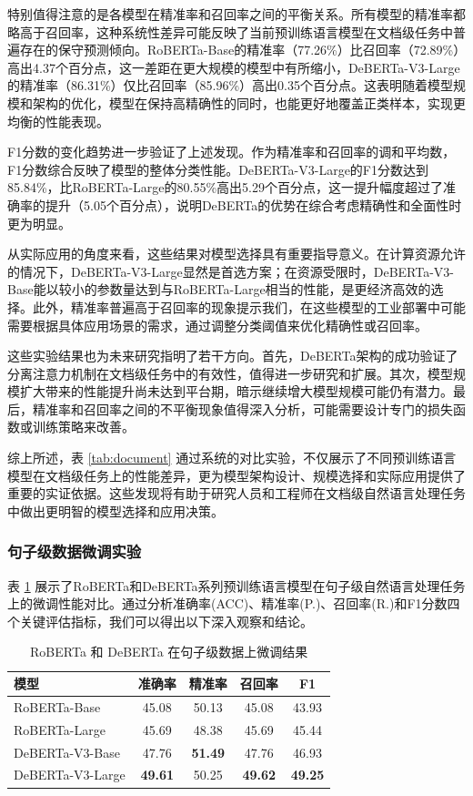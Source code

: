 特别值得注意的是各模型在精准率和召回率之间的平衡关系。所有模型的精准率都略高于召回率，这种系统性差异可能反映了当前预训练语言模型在文档级任务中普遍存在的保守预测倾向。RoBERTa-Base的精准率（77.26\%）比召回率（72.89\%）高出4.37个百分点，这一差距在更大规模的模型中有所缩小，DeBERTa-V3-Large的精准率（86.31\%）仅比召回率（85.96\%）高出0.35个百分点。这表明随着模型规模和架构的优化，模型在保持高精确性的同时，也能更好地覆盖正类样本，实现更均衡的性能表现。

F1分数的变化趋势进一步验证了上述发现。作为精准率和召回率的调和平均数，F1分数综合反映了模型的整体分类性能。DeBERTa-V3-Large的F1分数达到85.84\%，比RoBERTa-Large的80.55\%高出5.29个百分点，这一提升幅度超过了准确率的提升（5.05个百分点），说明DeBERTa的优势在综合考虑精确性和全面性时更为明显。

从实际应用的角度来看，这些结果对模型选择具有重要指导意义。在计算资源允许的情况下，DeBERTa-V3-Large显然是首选方案；在资源受限时，DeBERTa-V3-Base能以较小的参数量达到与RoBERTa-Large相当的性能，是更经济高效的选择。此外，精准率普遍高于召回率的现象提示我们，在这些模型的工业部署中可能需要根据具体应用场景的需求，通过调整分类阈值来优化精确性或召回率。

这些实验结果也为未来研究指明了若干方向。首先，DeBERTa架构的成功验证了分离注意力机制在文档级任务中的有效性，值得进一步研究和扩展。其次，模型规模扩大带来的性能提升尚未达到平台期，暗示继续增大模型规模可能仍有潜力。最后，精准率和召回率之间的不平衡现象值得深入分析，可能需要设计专门的损失函数或训练策略来改善。

综上所述，表 \ref{tab:document} 通过系统的对比实验，不仅展示了不同预训练语言模型在文档级任务上的性能差异，更为模型架构设计、规模选择和实际应用提供了重要的实证依据。这些发现将有助于研究人员和工程师在文档级自然语言处理任务中做出更明智的模型选择和应用决策。

\subsubsection{句子级数据微调实验}

表 \ref{tab:sentence} 展示了RoBERTa和DeBERTa系列预训练语言模型在句子级自然语言处理任务上的微调性能对比。通过分析准确率(ACC)、精准率(P.)、召回率(R.)和F1分数四个关键评估指标，我们可以得出以下深入观察和结论。

\begin{table}[htbp]
\caption{RoBERTa 和 DeBERTa 在句子级数据上微调结果}
\centering
\begin{tabular}{l|cccc}
\toprule
\textbf{模型}& \textbf{准确率}   & \textbf{精准率}    & \textbf{召回率}    & \textbf{F1}   \\ \midrule
RoBERTa-Base      & 45.08          & 50.13          & 45.08          & 43.93          \\
RoBERTa-Large     & 45.69          & 48.38          & 45.69          & 45.44          \\
DeBERTa-V3-Base   & 47.76          & \textbf{51.49} & 47.76          & 46.93          \\
DeBERTa-V3-Large  & \textbf{49.61} & 50.25          & \textbf{49.62} & \textbf{49.25} \\ \bottomrule
\end{tabular}
\label{tab:sentence}
\end{table}

